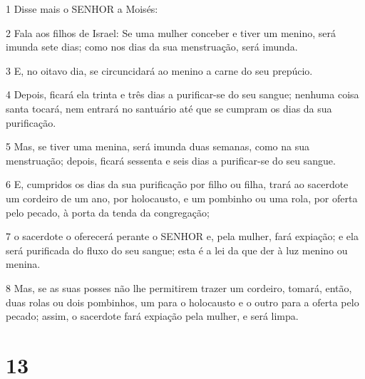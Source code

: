\par 1 Disse mais o SENHOR a Moisés:
\par 2 Fala aos filhos de Israel: Se uma mulher conceber e tiver um menino, será imunda sete dias; como nos dias da sua menstruação, será imunda.
\par 3 E, no oitavo dia, se circuncidará ao menino a carne do seu prepúcio.
\par 4 Depois, ficará ela trinta e três dias a purificar-se do seu sangue; nenhuma coisa santa tocará, nem entrará no santuário até que se cumpram os dias da sua purificação.
\par 5 Mas, se tiver uma menina, será imunda duas semanas, como na sua menstruação; depois, ficará sessenta e seis dias a purificar-se do seu sangue.
\par 6 E, cumpridos os dias da sua purificação por filho ou filha, trará ao sacerdote um cordeiro de um ano, por holocausto, e um pombinho ou uma rola, por oferta pelo pecado, à porta da tenda da congregação;
\par 7 o sacerdote o oferecerá perante o SENHOR e, pela mulher, fará expiação; e ela será purificada do fluxo do seu sangue; esta é a lei da que der à luz menino ou menina.
\par 8 Mas, se as suas posses não lhe permitirem trazer um cordeiro, tomará, então, duas rolas ou dois pombinhos, um para o holocausto e o outro para a oferta pelo pecado; assim, o sacerdote fará expiação pela mulher, e será limpa.

\chapter{13}

